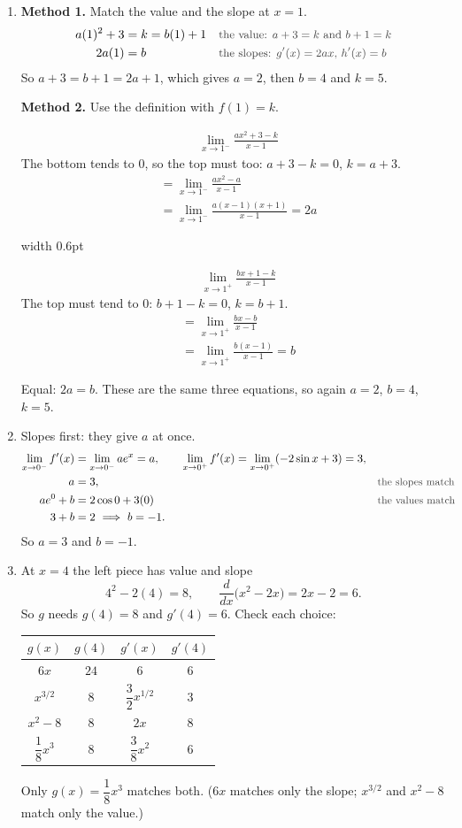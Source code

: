 \documentclass[11pt,a4paper]{article}
\newcounter{example}
\newcommand{\why}[1]{\text{\small\color{darkgray}#1}}
\newcommand{\twosides}[2]{\par\smallskip\noindent\begin{minipage}[t]{0.47\linewidth}#1\end{minipage}\hfill{\color{rulegray}\vrule width 0.6pt}\hfill\begin{minipage}[t]{0.47\linewidth}#2\end{minipage}\par\smallskip}
\newcommand{\imp}{\ \Longrightarrow\ }
\begin{document}
\begin{examplesolution}
\relax
\begin{enumerate}[label=(\alph*)]
 \item \textbf{Method 1.} Match the value and the slope at $x=1$.
 \begin{align*}
 a(1)^2+3&=k=b(1)+1 &&\why{the value: $a+3=k$ and $b+1=k$}\\
 2a(1)&=b &&\why{the slopes: $g'(x)=2ax$, $h'(x)=b$}
 \end{align*}
 So $a+3=b+1=2a+1$, which gives $a=2$, then $b=4$ and $k=5$.

 \textbf{Method 2.} Use the definition with $f(1)=k$.
 \twosides{%
 \begin{align*}
 &\lim_{x\to1^-}\frac{ax^2+3-k}{x-1}
 \end{align*}
 The bottom tends to $0$, so the top must too: $a+3-k=0$, $k=a+3$.
 \begin{align*}
 &=\lim_{x\to1^-}\frac{ax^2-a}{x-1}\\
 &=\lim_{x\to1^-}\frac{a(x-1)(x+1)}{x-1}=2a
 \end{align*}}{%
 \begin{align*}
 &\lim_{x\to1^+}\frac{bx+1-k}{x-1}
 \end{align*}
 The top must tend to $0$: $b+1-k=0$, $k=b+1$.
 \begin{align*}
 &=\lim_{x\to1^+}\frac{bx-b}{x-1}\\
 &=\lim_{x\to1^+}\frac{b(x-1)}{x-1}=b
 \end{align*}}
 Equal: $2a=b$. These are the same three equations, so again $a=2$, $b=4$, $k=5$.
 \item Slopes first: they give $a$ at once.
 \begin{align*}
 \lim_{x\to0^-}f'(x)&=\lim_{x\to0^-}ae^x=a,\qquad \lim_{x\to0^+}f'(x)=\lim_{x\to0^+}(-2\sin x+3)=3,\\
 a&=3, &&\why{the slopes match}\\
 ae^0+b&=2\cos0+3(0) &&\why{the values match}\\
 3+b&=2\imp b=-1.
 \end{align*}
 So $a=3$ and $b=-1$.
 \item At $x=4$ the left piece has value and slope
 \[
 4^2-2(4)=8,\qquad \frac{d}{dx}\bigl(x^2-2x\bigr)=2x-2=6.
 \]
 So $g$ needs $g(4)=8$ and $g'(4)=6$. Check each choice:
 \begin{center}
 \renewcommand{\arraystretch}{1.9}
 \begin{tabular}{|c|c|c|c|}\hline
 $g(x)$ & $g(4)$ & $g'(x)$ & $g'(4)$\\ \hline
 $6x$ & $24$ & $6$ & $6$\\ \hline
 $x^{3/2}$ & $8$ & $\dfrac32x^{1/2}$ & $3$\\ \hline
 $x^2-8$ & $8$ & $2x$ & $8$\\ \hline
 $\dfrac18x^3$ & $8$ & $\dfrac38x^2$ & $6$\\ \hline
 \end{tabular}
 \end{center}
 Only $g(x)=\dfrac18x^3$ matches both. ($6x$ matches only the slope; $x^{3/2}$ and $x^2-8$ match only the value.)
\end{enumerate}
\end{examplesolution}
\end{document}
